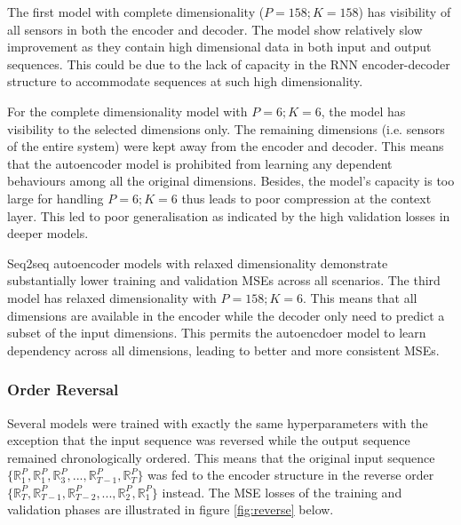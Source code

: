 \documentclass[11pt]{article} %
\theoremstyle{plain}
\theoremstyle{definition}
\begin{document}
The first model with complete dimensionality (\(P=158; K=158\)) has visibility of all sensors in both the encoder and decoder. The model show relatively slow improvement as they contain high dimensional data in both input and output sequences. This could be due to the lack of capacity in the RNN encoder-decoder structure to accommodate sequences at such high dimensionality.

For the complete dimensionality model with \(P=6; K=6\), the model has visibility to the selected dimensions only. The remaining dimensions (i.e. sensors of the entire system) were kept away from the encoder and decoder. This means that the autoencoder model is prohibited from learning any dependent behaviours among all the original dimensions. Besides, the model's capacity is too large for handling \(P=6; K=6\) thus leads to poor compression at the context layer. This led to poor generalisation as indicated by the high validation losses in deeper models.

Seq2seq autoencoder models with relaxed dimensionality demonstrate substantially lower training and validation MSEs across all scenarios. The third model has relaxed dimensionality with \(P=158; K=6\). This means that all dimensions are available in the encoder while the decoder only need to predict a subset of the input dimensions. This permits the autoencdoer model to learn dependency across all dimensions, leading to better and more consistent MSEs.

\subsubsection{Order Reversal}

Several models were trained with exactly the same hyperparameters with the exception that the input sequence was reversed while the output sequence remained chronologically ordered. This means that the original input sequence \(\{\mathbb{R}_1^P, \mathbb{R}_1^P, \mathbb{R}_3^P,...,\mathbb{R}_{T-1}^P, \mathbb{R}_T^P \}\) was fed to the encoder structure in the reverse order \(\{\mathbb{R}_T^P, \mathbb{R}_{T-1}^P, \mathbb{R}_{T-2}^P,...,\mathbb{R}_2^P, \mathbb{R}_1^P \}\) instead. The MSE losses of the training and validation phases are illustrated in figure \ref{fig:reverse} below. 
\end{document}
